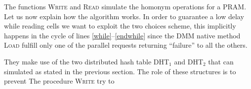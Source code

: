 \begin{algorithm}[H]
  \begin{algorithmic}[1]     
      \State {\Call{LocalRead}{$Y$, $C$} \Comment{Reads up to $C$ elements
          of $Y$ saved on $M_i$} 
      \For {$j \in \left[1,\dots C\right]$}
      \For {$D$ times}
      \State {\Call{Store}{$y_j$, $M_{h(y_j)}$} \Comment{Ordinary DMM
          storing mechanism}
      \EndFor
      \EndFor
      \EndParFor
    \EndProcedure
  \end{algorithmic}
\end{algorithm}


\begin{algorithm}[H]
  \begin{algorithmic}[1]
     
     \EndFor
      \State {\Call{Lookup}{DHT$_j$, $Z$}
      \ParFor {$i \in \left[1,\dots n\right]$}
      \If {$z_i$ found in DHT$_j$} 
        \State {Status$[i]$ = success}
        \EndIf
      \EndParFor
      \EndFor
      \While {$\exists \; k \in [1,\dots n]$ s.t. Status$[k]$ = failure}
      \label{while}
      \For {$j = 1,\; 2$}
      \ParFor {$i \in \left[1,\dots n\right]$}
      \If {Status$[i]$ = failure}
      \State {outc = \Call{Load}{$z_i$, $M_{h_j(z_i)}$}}
      \Comment{DMM loading mechanism}
      \EndIf
      \If {Status$[i]$ = failure \&  outc = success} 
      \State {Status$[i]$ = success} \label{endwhile}
      
      \EndWhile
     \EndProcedure
  \end{algorithmic}
\end{algorithm}

The functions \textsc{Write} and \textsc{Read} simulate the homonym operations
for a PRAM. Let us now explain how the algorithm works. In order to guarantee
a low delay while reading cells we want to exploit the two choices scheme,
this implicitly happens in the cycle of lines \ref{while}--\ref{endwhile} since
the DMM native method \textsc{Load} fulfill only one of the parallel requests
returning ``failure'' to all the others.


They make use of the two distributed hash table DHT$_1$
and DHT$_2$ that can simulated as stated in the previous section. The role
of these structures is to prevent 
The procedure \textsc{Write} try to







